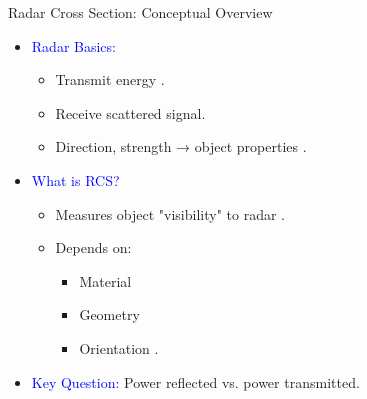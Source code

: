 \begin{frame}{Radar Cross Section: Conceptual Overview}
    \small
    \begin{itemize}
        \item \textcolor{blue}{Radar Basics:}
            \begin{itemize}
                \item Transmit energy \cite[p. 21]{skolnik1962introduction}.
                \item Receive scattered signal.
                \item Direction, strength → object properties \cite[p. 45]{knott2004radar}.
            \end{itemize}
        \item \textcolor{blue}{What is RCS?}
            \begin{itemize}
                \item Measures object "visibility" to radar \cite[Section 2]{cite-trcs}.
                \item Depends on:  
                    \begin{itemize}
                        \item Material  
                        \item Geometry  
                        \item Orientation \cite[pp. 3-4]{peebles2007radar}.
                    \end{itemize}
            \end{itemize}
        \item \textcolor{blue}{Key Question:}
            Power reflected vs. power transmitted.
    \end{itemize}
\end{frame}

